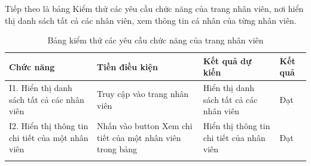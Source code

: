 Tiếp theo là bảng Kiểm thử các yêu cầu chức năng của trang nhân viên, nơi hiển thị danh sách tất cả các nhân viên, xem thông tin cá nhân của từng nhân viên.
\begin{longtable}{|p{4cm}|p{4cm}|p{4cm}|p{2cm}|}
    \hline
    Chức năng & Tiền điều kiện & Kết quả dự kiến & Kết quả \\
    \hline
    I1. Hiển thị danh sách tất cả các nhân viên & Truy cập vào trang nhân viên & Hiển thị danh sách tất cả các nhân viên & Đạt\\
    \hline
     I2. Hiển thị thông tin chi tiết của một nhân viên & Nhấn vào button Xem chi tiết của một nhân viên trong bảng  & Hiển thị thông tin chi tiết của nhân viên & Đạt\\
    \hline
    \caption{Bảng kiểm thử các yêu cầu chức năng của trang nhân viên}
\end{longtable}
\newpage
